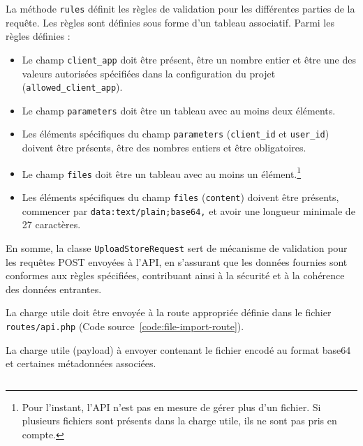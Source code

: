 La méthode \Verb|rules| définit les règles de validation pour les différentes parties de la requête. Les règles sont définies sous forme d'un tableau associatif. Parmi les règles définies :

\begin{itemize}
    \item Le champ \Verb|client_app| doit être présent, être un nombre entier et être une des valeurs autorisées spécifiées dans la configuration du projet (\Verb|allowed_client_app|).
    \item Le champ \Verb|parameters| doit être un tableau avec au moins deux éléments.
    \item Les éléments spécifiques du champ \Verb|parameters| (\Verb|client_id| et \Verb|user_id|) doivent être présents, être des nombres entiers et être obligatoires.
    \item Le champ \Verb|files| doit être un tableau avec au moins un élément.\footnote{Pour l'instant, l'API n'est pas en mesure de gérer plus d'un fichier. Si plusieurs fichiers sont présents dans la charge utile, ils ne sont pas pris en compte.}
    \item Les éléments spécifiques du champ \Verb|files| (\Verb|content|) doivent être présents, commencer par \Verb|data:text/plain;base64,| et avoir une longueur minimale de 27 caractères.
\end{itemize}

En somme, la classe \Verb|UploadStoreRequest| sert de mécanisme de validation pour les requêtes POST envoyées à l'API, en s'assurant que les données fournies sont conformes aux règles spécifiées, contribuant ainsi à la sécurité et à la cohérence des données entrantes.

La charge utile doit être envoyée à la route appropriée définie dans le fichier \Verb|routes/api.php| (Code source~\ref{code:file-import-route}).

\begin{code}
    \caption{La charge utile (payload) à envoyer contenant le fichier encodé au format base64 et certaines métadonnées associées.}
    \inputminted[samepage]{json}{code/lccc-payload.json}
    \label{code:lccc-payload}
\end{code}


